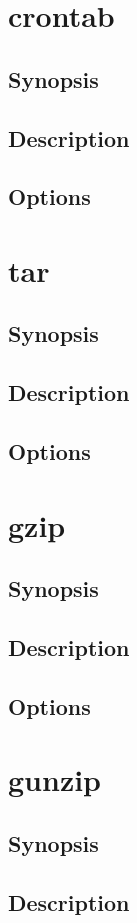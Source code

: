 \documentclass[a4paper, 10pt, onecolumn, openright, oneside]{book}
\begin{document}
		\section{crontab}
			\subsection{Synopsis}
			\subsection{Description}
			\subsection{Options}
		\section{tar}
			\subsection{Synopsis}
			\subsection{Description}
			\subsection{Options}
		\section{gzip}
			\subsection{Synopsis}
			\subsection{Description}
			\subsection{Options}
		\section{gunzip}
			\subsection{Synopsis}
			\subsection{Description}
\end{document}
